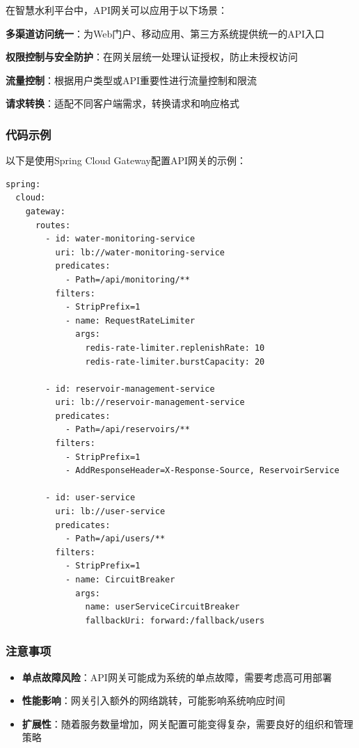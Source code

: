 在智慧水利平台中，API网关可以应用于以下场景：

\textbf{多渠道访问统一}：为Web门户、移动应用、第三方系统提供统一的API入口

\textbf{权限控制与安全防护}：在网关层统一处理认证授权，防止未授权访问

\textbf{流量控制}：根据用户类型或API重要性进行流量控制和限流

\textbf{请求转换}：适配不同客户端需求，转换请求和响应格式

\subsubsection{代码示例}\label{ux4ee3ux7801ux793aux4f8b-1}

以下是使用Spring Cloud Gateway配置API网关的示例：

\begin{lstlisting}
spring:
  cloud:
    gateway:
      routes:
        - id: water-monitoring-service
          uri: lb://water-monitoring-service
          predicates:
            - Path=/api/monitoring/**
          filters:
            - StripPrefix=1
            - name: RequestRateLimiter
              args:
                redis-rate-limiter.replenishRate: 10
                redis-rate-limiter.burstCapacity: 20
        
        - id: reservoir-management-service
          uri: lb://reservoir-management-service
          predicates:
            - Path=/api/reservoirs/**
          filters:
            - StripPrefix=1
            - AddResponseHeader=X-Response-Source, ReservoirService
        
        - id: user-service
          uri: lb://user-service
          predicates:
            - Path=/api/users/**
          filters:
            - StripPrefix=1
            - name: CircuitBreaker
              args:
                name: userServiceCircuitBreaker
                fallbackUri: forward:/fallback/users
\end{lstlisting}

\subsubsection{注意事项}\label{ux6ce8ux610fux4e8bux9879-1}

\begin{itemize}
\tightlist
\item
  \textbf{单点故障风险}：API网关可能成为系统的单点故障，需要考虑高可用部署
\item
  \textbf{性能影响}：网关引入额外的网络跳转，可能影响系统响应时间
\item
  \textbf{扩展性}：随着服务数量增加，网关配置可能变得复杂，需要良好的组织和管理策略
\end{itemize}

